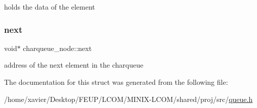 holds the data of the element 

\mbox{\label{structcharqueue__node_ab9d47897aacd373697e5083ae4bccd7d}} 
\subsubsection{\texorpdfstring{next}{next}}
{\footnotesize\ttfamily void$\ast$ charqueue\+\_\+node\+::next}



address of the next element in the charqueue 



The documentation for this struct was generated from the following file\+:\begin{DoxyCompactItemize}
\item 
/home/xavier/\+Desktop/\+F\+E\+U\+P/\+L\+C\+O\+M/\+M\+I\+N\+I\+X-\/\+L\+C\+O\+M/shared/proj/src/\hyperlink{queue_8h}{queue.\+h}\end{DoxyCompactItemize}
